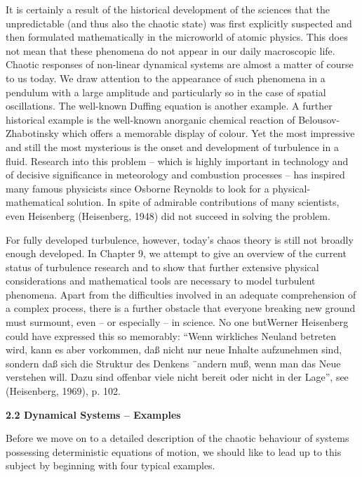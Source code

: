 \documentclass[12pt]{article}
\begin{document}
\hfill

It is certainly a result of the historical development of the sciences that the unpredictable
(and thus also the chaotic state) was first explicitly suspected and then
formulated mathematically in the microworld of atomic physics. This does not mean
that these phenomena do not appear in our daily macroscopic life. Chaotic responses
of non-linear dynamical systems are almost a matter of course to us today. We draw
attention to the appearance of such phenomena in a pendulum with a large amplitude
and particularly so in the case of spatial oscillations. The well-known Duffing
equation is another example. A further historical example is the well-known anorganic
chemical reaction of Belousov-Zhabotinsky which offers a memorable display
of colour. Yet the most impressive and still the most mysterious is the onset and
development of turbulence in a fluid. Research into this problem – which is highly
important in technology and of decisive significance in meteorology and combustion
processes – has inspired many famous physicists since Osborne Reynolds to
look for a physical-mathematical solution. In spite of admirable contributions of
many scientists, even Heisenberg (Heisenberg, 1948) did not succeed in solving the
problem.

\hfill

For fully developed turbulence, however, today’s chaos theory is still not broadly
enough developed. In Chapter 9, we attempt to give an overview of the current
status of turbulence research and to show that further extensive physical considerations
and mathematical tools are necessary to model turbulent phenomena. Apart
from the difficulties involved in an adequate comprehension of a complex process,
there is a further obstacle that everyone breaking new ground must surmount, even
– or especially – in science. No one butWerner Heisenberg could have expressed this
so memorably: “Wenn wirkliches Neuland betreten wird, kann es aber vorkommen,
daß nicht nur neue Inhalte aufzunehmen sind, sondern daß sich die Struktur des
Denkens ¨andern muß, wenn man das Neue verstehen will. Dazu sind offenbar viele
nicht bereit oder nicht in der Lage”, see (Heisenberg, 1969), p. 102.

\hfill

\textbf{2.2 Dynamical Systems – Examples}

\hfill


Before we move on to a detailed description of the chaotic behaviour of systems
possessing deterministic equations of motion, we should like to lead up to this subject
by beginning with four typical examples.
\end{document}
